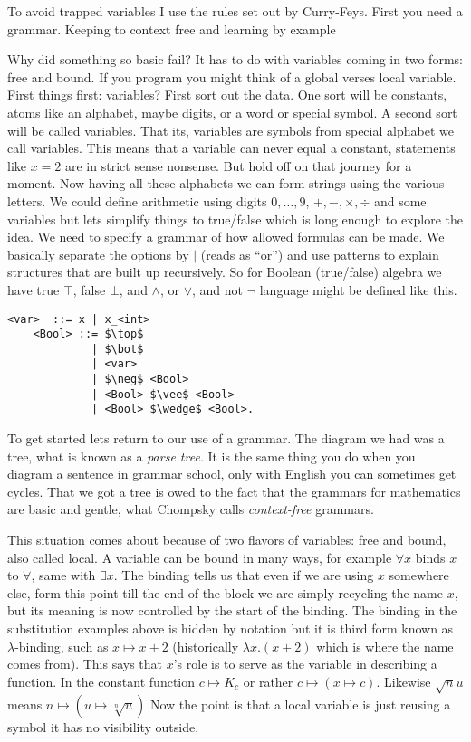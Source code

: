 To avoid trapped variables I use the rules set out by Curry-Feys.
First you need a grammar.  Keeping to context free and learning by example

Why did something so basic fail?  It has to do with variables coming in 
two forms: free and bound.  If you program you might think of a global 
verses local variable.  First things first: variables?
First sort out the data.  One sort will be constants, atoms like an alphabet,
maybe digits, or a word or special symbol. A second sort will be called variables.
That its, variables are symbols from special alphabet we call variables.
This means that a variable can never equal a constant, statements like $x=2$ 
are in strict sense nonsense.  But hold off on that journey for a moment.
Now having all these alphabets we can form strings using the various letters.
We could define arithmetic using digits $0,\ldots, 9$, $+,-,\times,\div$ and some 
variables but lets simplify things to true/false which is long enough to 
explore the idea.  We need to specify a grammar of how allowed formulas can 
be made.  We basically separate the options by $\mid$ (reads as ``or'')
and use patterns to explain structures that are built up recursively.
So for Boolean (true/false) algebra we have true $\top$, false $\bot$, 
and $\wedge$, or $\vee$, and not $\neg$ language might be defined like this.
\newpage    
\begin{lstfloat}
\begin{lstlisting}[mathescape]
    <var>  ::= x | x_<int>
    <Bool> ::= $\top$ 
             | $\bot$ 
             | <var>
             | $\neg$ <Bool> 
             | <Bool> $\vee$ <Bool> 
             | <Bool> $\wedge$ <Bool>.
\end{lstlisting}
\end{lstfloat}

To get started lets return to our use of a grammar.  The diagram we had 
was a tree, what is known as a \emph{parse tree}.  It is the same thing you 
do when you diagram a sentence in grammar school, only with English you can 
sometimes get cycles.  That we got a tree is owed to the fact that the grammars 
for mathematics are basic and gentle, what Chompsky calls \emph{context-free} grammars.

This situation comes about because of two flavors of variables: free and bound,
also called local.  A variable can be bound in many ways, for example 
$\forall x$ binds $x$ to $\forall$, same with $\exists x$.  The binding tells 
us that even if we are using $x$ somewhere else, form this point till 
the end of the block we are simply recycling the name $x$, but its meaning 
is now controlled by the start of the binding.  The binding in the 
substitution examples above is hidden by notation but it is third form 
known as $\lambda$-binding, such as $x\mapsto x+2$ (historically 
$\lambda x.(x+2)$ which is where the name comes from).  This says that 
$x$'s role is to serve as the variable in describing a function.
In the constant function $c\mapsto K_c$ or rather $c\mapsto (x\mapsto c)$.
Likewise $\sqrt{n}{u}$ means $n\mapsto (u\mapsto \sqrt[n]{u})$
Now the point is that a local variable is just reusing a symbol it has 
no visibility outside.

